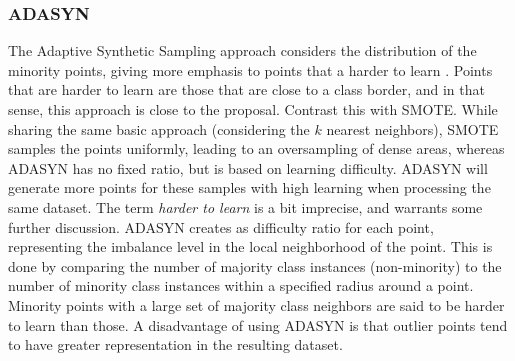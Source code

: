 \documentclass[letterpaper]{report}
\begin{document}
\subsubsection{ADASYN}
\label{section:adasyn}
The Adaptive Synthetic Sampling approach considers the distribution of the minority points, giving more emphasis to points that a harder to learn \parencite{He2008-xr}. Points that are harder to learn are those that are close to a class border, and in that sense, this approach is close to the  proposal. Contrast this with SMOTE. While sharing the same basic approach (considering the $k$ nearest neighbors), SMOTE samples the points uniformly, leading to an oversampling of dense areas, whereas ADASYN has no fixed ratio, but is based on learning difficulty. ADASYN will generate more points for these samples with high learning when processing the same dataset. The term \textit{harder to learn} is a bit imprecise, and warrants some further discussion. ADASYN creates as difficulty ratio for each point, representing the imbalance level in the local neighborhood of the point. This is done by comparing the number of majority class instances (non-minority) to the number of minority class instances within a specified radius around a point. Minority points with a large set of majority class neighbors are said to be harder to learn than those. A disadvantage of using ADASYN is that outlier points tend to have greater representation in the resulting dataset.
\end{document}
